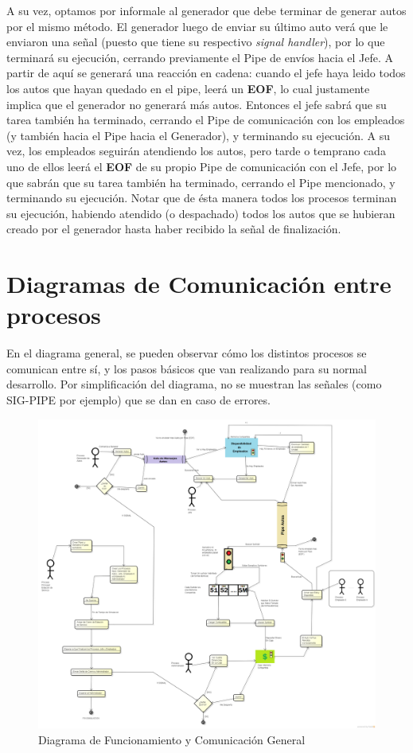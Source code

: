 \documentclass[a4paper,12pt]{article}
\begin{document}
A su vez, optamos por informale al generador que debe terminar de generar autos por el mismo método. El generador luego de enviar su último auto verá que le enviaron una señal (puesto que tiene su respectivo \textit{signal handler}), por lo que terminará su ejecución, cerrando previamente el Pipe de envíos hacia el Jefe. A partir de aquí se generará una reacción en cadena: cuando el jefe haya leido todos los autos que hayan quedado en el pipe, leerá un \textbf{EOF}, lo cual justamente implica que el generador no generará más autos. Entonces el jefe sabrá que su tarea también ha terminado, cerrando el Pipe de comunicación con los empleados (y también hacia el Pipe hacia el Generador), y terminando su ejecución. A su vez, los empleados seguirán atendiendo los autos, pero tarde o temprano cada uno de ellos leerá el \textbf{EOF} de su propio Pipe de comunicación con el Jefe, por lo que sabrán que su tarea también ha terminado, cerrando el Pipe mencionado, y terminando su ejecución. Notar que de ésta manera todos los procesos terminan su ejecución, habiendo atendido (o despachado) todos los autos que se hubieran creado por el generador hasta haber recibido la señal de finalización.

\section{Diagramas de Comunicación entre procesos}
	En el diagrama general, se pueden observar cómo los distintos procesos se comunican entre sí, y los pasos básicos que van realizando para su normal desarrollo.
	Por simplificación del diagrama, no se muestran las señales (como SIG-PIPE por ejemplo) que se dan en caso de errores.

\begin{figure}
\centering
\includegraphics[width=\textwidth]{Diagramas/DiagramaFuncionamientoGeneral.png} 	
\caption{Diagrama de Funcionamiento y Comunicación General}
\label{fig:DiagramaFuncionamientoGeneral}
\end{figure}
\end{document}
